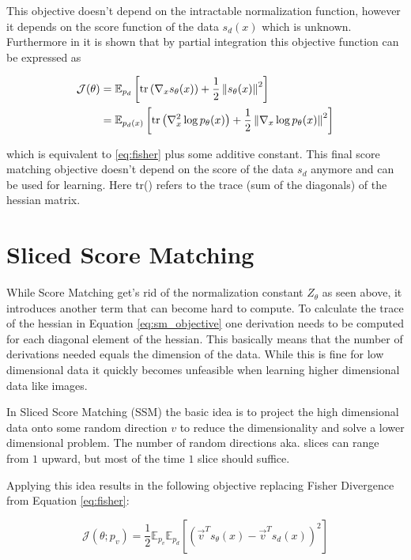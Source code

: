 This objective doesn't depend on the intractable normalization function, however it depends on the score function of the data 
$s_d(x)$ which is unknown. Furthermore in \cite{sm} it is shown that by partial integration this objective function can be expressed as 

\begin{align}
    \label{eq:sm_objective}
    \mathcal{J}(\theta) & = \mathbb{E}_{p_d} \left[\text{tr} \left( \nabla_x s_\theta(x) \right) + \frac{1}{2} \left\| s_\theta(x) \right\|^2 \right] \notag \\ 
    & = \mathbb{E}_{p_d(x)} \left[\text{tr} \left( \nabla_x^2 \log p_\theta(x) \right) + \frac{1}{2} \left\| \nabla_x \log p_\theta(x) \right\|^2 \right]
\end{align}

which is equivalent to \ref{eq:fisher} plus some additive constant. This final score matching objective doesn't depend on the score of the data $s_d$ anymore and can be used for learning. Here tr() refers to the
trace (sum of the diagonals) of the hessian matrix.

\section{Sliced Score Matching}
\label{sec:ssm}

While Score Matching get's rid of the normalization constant $Z_\theta$ as seen above, it introduces another term that can become hard
to compute. To calculate the trace of the hessian in Equation \ref{eq:sm_objective} one derivation needs to be computed for each diagonal element of the hessian.
This basically means that the number of derivations needed equals the dimension of the data. 
While this is fine for low dimensional data it quickly becomes unfeasible when
learning higher dimensional data like images.  

In Sliced Score Matching (SSM) \cite{ssm} the basic idea is to project the high dimensional data onto some random direction $v$ to reduce 
the dimensionality and solve a lower dimensional problem. The number of random directions aka. slices can range from $1$ upward, but 
most of the time $1$ slice should suffice. 

Applying this idea results in the following objective replacing Fisher Divergence from Equation \ref{eq:fisher}: 

\begin{equation}
    \label{eq:ssm}
    \mathcal{J}(\theta; p_v) = \frac{1}{2} \mathbb{E}_{p_v} \mathbb{E}_{p_d} \left[ \left( \vec{v}^T s_\theta(x) - \vec{v}^T s_d(x) \right)^2 \right]
\end{equation}

